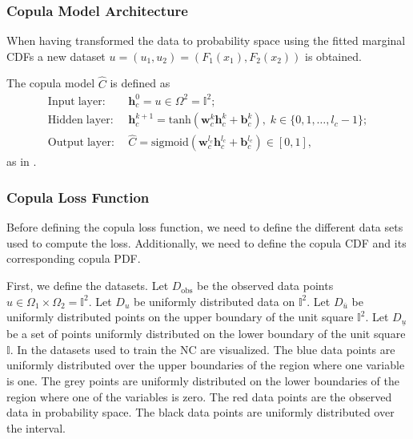 \subsubsection{Copula Model Architecture} 
When having transformed the data to probability space using the fitted marginal \gls{CDF}s a new dataset $u = (u_1,u_2) = (F_1(x_1), F_2(x_2))$ is obtained. 

The copula model $\hat{C}$ is defined as 
\begin{align*}
    \mathrm{Input\;layer:} \; & \mathbf{h}_c^0 = u \in \Omega^2 = \mathbb{I}^2; \\
    \mathrm{Hidden\;layer:} \; & \mathbf{h}_c^{k+1} = \mathrm{tanh}(\mathbf{w}_c^{k} \mathbf{h}_c^{k} + \mathbf{b}_c^{k}), \; k \in \{0,1, \dots, l_c -1 \};\\
    \mathrm{Output\;layer:} \; & \hat{C} = \mathrm{sigmoid}(\mathbf{w}_c^{l_c} \mathbf{h}_c^{l_c} + \mathbf{b}_c^{l_c}) \in \left[0,1 \right],
\end{align*}
as in .

\subsubsection{Copula Loss Function}\label{sec:NeuralCopulaLoss}
Before defining the copula loss function, we need to define the different data sets used to compute the loss. Additionally, we need to define the copula \gls{CDF} and its corresponding copula \gls{PDF}. 

First, we define the datasets. Let $D_{\mathrm{obs}}$ be the observed data points $u \in \Omega_1 \times \Omega_2  = \mathbb{I}^2$. Let $D_{u}$ be uniformly distributed data on $\mathbb{I}^2$. Let $D_{\bar{u}}$ be uniformly distributed points on the upper boundary of the unit square $\mathbb{I}^2$. Let $D_{\underline{u}}$ be a set of points uniformly distributed on the lower boundary of the unit square $\mathbb{I}$. In  the datasets used to train the \gls{NC} are visualized. The blue data points are uniformly distributed over the upper boundaries of the region where one variable is one. The grey points are uniformly distributed on the lower boundaries of the region where one of the variables is zero. The red data points are the observed data in probability space. The black data points are uniformly distributed over the interval. 

